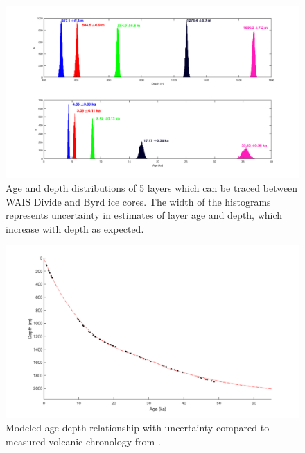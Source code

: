 \begin{figure}[h]
\centering
\includegraphics[scale=0.5]{figures/agedepthhisto}
\caption[]{Age and depth distributions of 5 layers which can be traced between WAIS Divide and Byrd ice cores. The width of the histograms represents uncertainty in estimates of layer age and depth, which increase with depth as expected. }
\label{fig:layer_agedepth}
\end{figure}

\begin{figure}[h]
\centering
\includegraphics[scale=0.3]{figures/spaghetti}
\caption[]{Modeled age-depth relationship with uncertainty compared to measured volcanic chronology from \citet{hammer97}. }
\label{fig:layer_agedepth}
\end{figure}